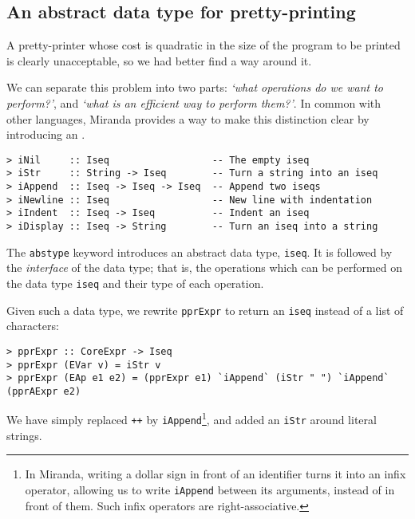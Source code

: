 \subsection{An abstract data type for pretty-printing}

A pretty-printer whose cost is quadratic in the size of the program
to be printed is clearly unacceptable, so we had better find a way around it.

We can separate this problem into two parts: {\em `what operations do
we want to perform?'}, and {\em `what is an efficient way to
perform them?'}.  In common with other languages, Miranda provides a way
to make this distinction clear by introducing an .

\begin{verbatim}
> iNil     :: Iseq                  -- The empty iseq
> iStr     :: String -> Iseq        -- Turn a string into an iseq
> iAppend  :: Iseq -> Iseq -> Iseq  -- Append two iseqs
> iNewline :: Iseq                  -- New line with indentation
> iIndent  :: Iseq -> Iseq          -- Indent an iseq
> iDisplay :: Iseq -> String        -- Turn an iseq into a string
\end{verbatim}
%
%
%
%
%
%
The \mbox{\tt abstype} keyword introduces an abstract data type, \mbox{\tt iseq}.
It is followed by the {\em interface\/}
of the data type; that is, the operations
which can be performed on the data type \mbox{\tt iseq} and their type of each
operation.

Given such a data type, we rewrite \mbox{\tt pprExpr} to return an \mbox{\tt iseq} instead
of a list of characters:
\begin{verbatim}
> pprExpr :: CoreExpr -> Iseq
> pprExpr (EVar v) = iStr v
> pprExpr (EAp e1 e2) = (pprExpr e1) `iAppend` (iStr " ") `iAppend` (pprAExpr e2)
\end{verbatim}
%
%
%
We have simply replaced \mbox{\tt ++} by \mbox{\tt iAppend}\footnote{%
In Miranda, writing a dollar
sign in front of an identifier turns it into an
infix operator,
allowing us to write \mbox{\tt iAppend} between its arguments, instead
of in front of them.  Such infix operators are right-associative.
}, and added an \mbox{\tt iStr} around
literal strings.

